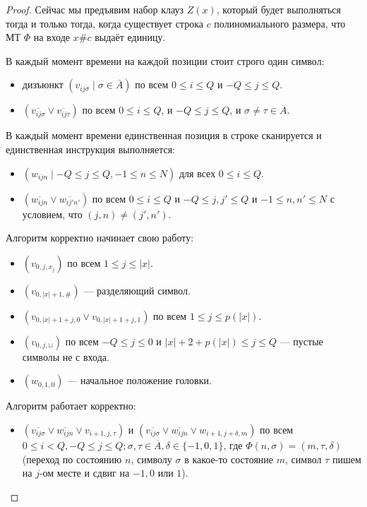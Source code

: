 \begin{proof}
  Сейчас мы предъявим набор клауз $Z(x)$, который будет выполняться тогда и
  только тогда, когда существует строка $c$ полиномиального размера, что 
  МТ $\Phi$ на входе $x\#c$ выдаёт единицу.

  В каждый момент времени на каждой позиции стоит строго один символ:

  \begin{itemize}
    \item дизъюнкт $(v_{ij\sigma} \mid \sigma \in \overline{A})$ по всем 
    $0 \leqslant i \leqslant Q$ и $-Q \leqslant j \leqslant Q$.
    \item $(\overline{v_{ij\sigma}} \vee \overline{v_{ij\tau}})$ по всем 
    $0 \leqslant i \leqslant Q$, и $-Q \leqslant j \leqslant Q$, и $\sigma \neq
    \tau \in \overline{A}$.
  \end{itemize}

  В каждый момент времени единственная позиция в строке сканируется и
  единственная инструкция выполняется:

  \begin{itemize}
    \item $(w_{ijn} \mid -Q \leqslant j \leqslant Q, -1 \leqslant n \leqslant N)$
    для всех $0 \leqslant i \leqslant Q$.
    \item $(\overline{w_{ijn}} \vee \overline{w_{ij'n'}})$ по всем 
    $0 \leqslant i \leqslant Q$ и $-Q \leqslant j, j' \leqslant Q$ и 
    $-1\leqslant n, n' \leqslant N$ с условием, что $(j, n) \neq (j', n')$.
  \end{itemize}

  Алгоритм корректно начинает свою работу:

  \begin{itemize}
    \item $(v_{0, j, x_j})$ по всем $1 \leqslant j \leqslant |x|$.
    \item $(v_{0, |x| + 1, \#})$ --- разделяющий символ.
    \item $(v_{0, |x |+ 1 + j, 0} \vee v_{0, |x| + 1 + j, 1})$
    по всем $1 \leqslant j \leqslant p(|x|)$.
    \item $(v_{0, j, \sqcup})$ по всем $-Q \leqslant j \leqslant 0$ и
    $|x| + 2 + p(|x|) \leqslant j \leqslant Q$ --- пустые символы не с входа.
    \item $(w_{0,1,0})$ --- начальное положение головки.
  \end{itemize}

  Алгоритм работает корректно:

  \begin{itemize}
    \item $(\overline{v_{ij\sigma}} \vee \overline{w_{ijn}} \vee v_{i + 1, j, \tau})$ и
    $(\overline{v_{ij\sigma}} \vee \overline{w_{ijn}} \vee w_{i + 1, j + \delta, m})$
    по всем $0 \leqslant i < Q, -Q \leqslant j\leqslant Q; \sigma, \tau \in 
    \overline{A}, \delta \in \{-1, 0, 1\}$, где $\Phi(n, \sigma) = 
    (m, \tau, \delta)$ (переход по состоянию $n$, символу $\sigma$ в какое-то
    состояние $m$, символ $\tau$ пишем на $j$-ом месте и сдвиг на $-1, 0$ или $1$).
  \end{itemize}


\end{proof}
